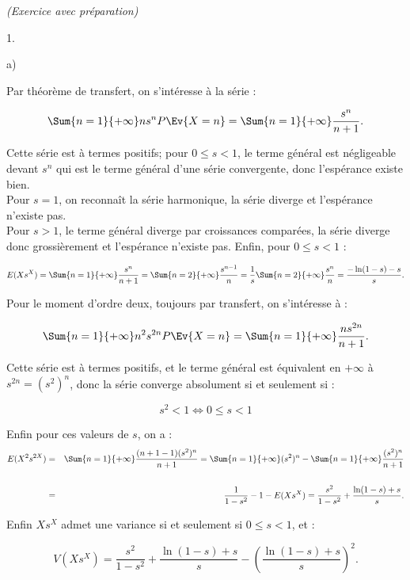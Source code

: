 \documentclass[11pt]{article}%
\begin{document}
\begin{exercice}{\it (Exercice avec préparation)}
\begin{noliste}{1.}
\begin{noliste}{a)}
 \item Par théorème de transfert, on s'intéresse à la série :
 
\[
 \Sum{n = 1}{+ \infty} n s^{n} P \Ev{ X = n } = \Sum{n = 1}{+ \infty}
\frac{ s^{n} }{ n + 1 }. \]


 Cette série est à termes positifs; pour $0 \leq s < 1$, le terme
général est négligeable devant $s^{n}$ qui est le terme général d'une
série convergente, donc l'espérance existe bien. \\

 Pour $s = 1$, on reconnaît la série harmonique, la série diverge et
l'espérance n'existe pas. \\

 Pour $s > 1$, le terme général diverge par croissances comparées, la
série diverge donc grossièrement et l'espérance n'existe pas. Enfin,
pour $0 \leq s < 1$ : 
 
\[
 E ( X s^{X} ) = \Sum{n = 1}{+ \infty} \frac{ s^{n} }{ n + 1 } = \Sum{n
= 2}{+ \infty} \frac{ s^{n-1} }{ n } = \frac{1}{s} \Sum{n = 2}{+
\infty} \frac{ s^{n} }{ n } = \frac{ - \ln (1-s) - s }{ s }. 
\]

 Pour le moment d'ordre deux, toujours par transfert, on s'intéresse à
: 
 
\[
 \Sum{n = 1}{+ \infty} n^{2} s^{2n} P \Ev{ X = n } = \Sum{n = 1}{+
\infty} \frac{ n s^{2n} }{ n + 1 }. 
\]

 Cette série est à termes positifs, et le terme général est équivalent
en $ + \infty$ à $s^{2n} = (s^{2})^{n}$, donc la série converge
absolument si et seulement si : 
 
\[
 s^{2} < 1 \Longleftrightarrow 0\leq s < 1 
\]



 Enfin pour ces valeurs de $s$, on a : 
 \begin{eqnarray*}
 E ( X^{2} s^{ 2X } ) & = & \Sum{n = 1}{+ \infty} \frac{ (n + 1 - 1 )
(s^{2})^{n} }{ n + 1 } = \Sum{n = 1}{+ \infty} (s^{2})^{n} - \Sum{n =
1}{+ \infty} \frac{ (s^{2})^{n} }{ n + 1 } \\
\\
 & = & \frac{ 1 }{ 1 - s^{2} } - 1 - E ( X s^{X} ) = \frac{ s^{2} }{ 1
- s^{2} } + \frac{ \ln (1-s) + s }{ s }. 
 \end{eqnarray*}

 Enfin $X s^{X}$ admet une variance si et seulement si $0 \leq s < 1$,
et : 
 
\[
 V ( X s^{X} ) = \frac{ s^{2} }{ 1 - s^{2} } + \frac{ \ln (1-s) + s }{
s } - \left( \frac{ \ln (1-s) + s }{ s } \right)^{2}. 
\]


\end{noliste}
\end{noliste}
\end{exercice}
\end{document}
